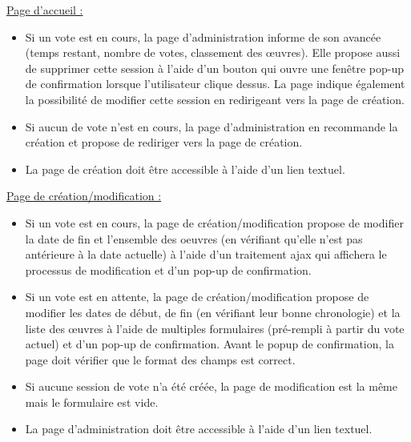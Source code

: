\documentclass[a4paper]{article}
\begin{document}
\underline{Page d'accueil :}\\
\begin{itemize}
\item Si un vote est en cours, la page d’administration informe de son avancée (temps restant, nombre de votes, classement des œuvres). Elle propose aussi de supprimer cette session à l’aide d’un bouton qui ouvre une fenêtre pop-up de confirmation lorsque l'utilisateur clique dessus. La page indique également la possibilité de modifier cette session en redirigeant vers la page de création.\\

\item Si aucun de vote n’est en cours, la page d’administration en recommande la création et propose de rediriger vers la page de création.\\

\item La page de création doit être accessible à l’aide d’un lien textuel.\\
\end{itemize}

\underline{Page de création/modification :}\\

\begin{itemize}
\item Si un vote est en cours, la page de création/modification propose de modifier la date de fin et l'ensemble des oeuvres (en vérifiant qu'elle n'est pas antérieure à la date actuelle) à l’aide d'un traitement ajax qui affichera le processus de modification et d'un pop-up de confirmation.\\ %

\item Si un vote est en attente, la page de création/modification propose de modifier les dates de début, de fin (en vérifiant leur bonne chronologie) et la liste des œuvres à l’aide de multiples formulaires (pré-rempli à partir du vote actuel) et d'un pop-up de confirmation. Avant le popup de confirmation, la page doit vérifier que le format des champs est correct.\\

\item Si aucune session de vote n’a été créée, la page de modification est la même mais le formulaire est vide.\\

\item La page d’administration doit être accessible à l’aide d’un lien textuel.\\
\end{itemize}
\newpage
\end{document}
